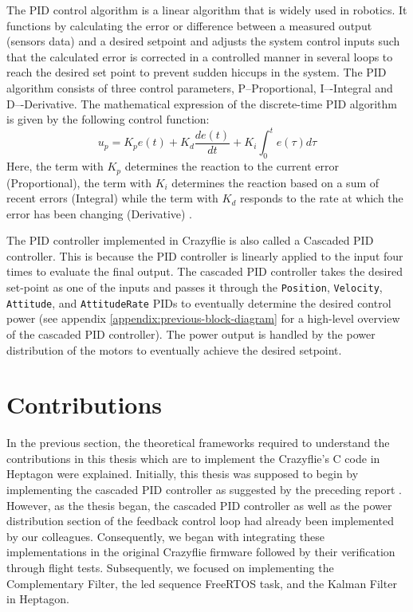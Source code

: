 \documentclass[10pt, a4paper]{article}
\newcommand{\code}[1]{\texttt{#1}}
\begin{document}
    The PID control algorithm is a linear algorithm that is widely used in robotics. It functions by calculating the error or difference between a measured output (sensors data) and a desired setpoint and adjusts the system control inputs such that the calculated error is corrected in a controlled manner in several loops to reach the desired set point to prevent sudden hiccups in the system. The PID algorithm consists of three control parameters,  P--Proportional, I–-Integral and D–-Derivative. The mathematical expression of the discrete-time PID algorithm is given by the following control function: 
            $$u_p = K_pe(t) + K_d\frac{de(t)}{dt} + K_i \int_0^te(\tau)d\tau$$ 
    Here, the term with $K_p$ determines the reaction to the current error (Proportional), the term with $K_i$ determines the reaction based on a sum of recent errors (Integral) while the term with $K_d$ responds to the rate at which the error has been changing (Derivative) \cite{article:pid-controller-IIJEM}.

    The PID controller implemented in Crazyflie is also called a Cascaded PID controller. This is because the PID controller is linearly applied to the input four times to evaluate the final output. The cascaded PID controller takes the desired set-point as one of the inputs and passes it through the \code{Position}, \code{Velocity}, \code{Attitude}, and \code{AttitudeRate} PIDs to eventually determine the desired control power (see appendix \ref{appendix:previous-block-diagram} for a high-level overview of the cascaded PID controller). The power output is handled by the power distribution of the motors to eventually achieve the desired setpoint.
    
\section{Contributions}
    \label{section:contributions}
    In the previous section, the theoretical frameworks required to understand the contributions in this thesis which are to implement the Crazyflie's C code in Heptagon were explained. Initially, this thesis was supposed to begin by implementing the cascaded PID controller as suggested by the  preceding report \cite{report:cse303-report}. However, as the thesis began, the cascaded PID controller as well as the power distribution section of the feedback control loop had already been implemented by our colleagues. Consequently, we began with integrating these implementations in the original Crazyflie firmware followed by their verification through flight tests. Subsequently, we focused on implementing the Complementary Filter, the led sequence FreeRTOS task, and the Kalman Filter in Heptagon.
    
\end{document}
